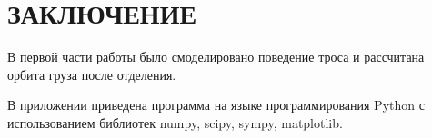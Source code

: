 \section*{ЗАКЛЮЧЕНИЕ}

В первой части работы было смоделировано поведение троса и рассчитана орбита груза после отделения.

В приложении приведена программа на языке программирования Python с использованием библиотек numpy, scipy, sympy, matplotlib.